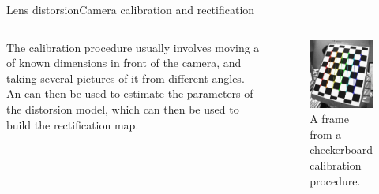 \begin{frame}{Lens distorsion}{Camera calibration and rectification}
	\begin{columns}
		The calibration procedure usually involves moving a  of known dimensions in front of the camera, and taking several pictures of it from different angles.
		\newline\newline
		An  can then be used to estimate the parameters of the distorsion model, which can then be used to build the rectification map.

		\begin{figure}
			\centering
			\includegraphics[width=.6\textwidth]{calibration}
			\caption{A frame from a checkerboard calibration procedure.}
			\label{fig:calibration}
		\end{figure}
	\end{columns}
\end{frame}
